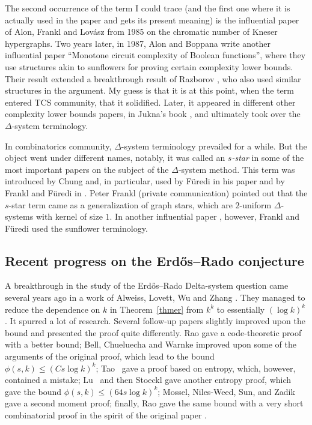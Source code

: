 \documentclass[graybox]{svmult}
\renewcommand{\le}{\leqslant}
\begin{document}
The second occurrence of the term I could trace (and the first one where it is actually used in the paper and gets its present meaning) is the influential paper of Alon, Frankl and Lov\'asz \cite{AFL} from 1985 on the chromatic number of Kneser hypergraphs. Two years later, in 1987, Alon and Boppana \cite{AB} write another influential paper ``Monotone circuit complexity of Boolean functions'', where they use structures akin to sunflowers for proving certain complexity lower bounds. Their result extended a breakthrough result of Razborov \cite{Raz}, who also used similar structures in the argument. My guess is that it is at this point, when the term entered TCS community, that it solidified. Later, it appeared in different other complexity lower bounds papers, in Jukna's book \cite{Juk}, and ultimately took over the $\Delta$-system terminology.

In combinatorics community, $\Delta$-system terminology prevailed for a while. But the object went under different names, notably, it was called an {\it $s$-star} in some of the most important papers on the subject of the $\Delta$-system method. This term was introduced by Chung and, in particular, used by F\"uredi in his paper \cite{Fu1} and by Frankl and F\"uredi in \cite{FF1}. Peter Frankl (private communication) pointed out that the $s$-star term came as a generalization of graph stars, which are $2$-uniform $\Delta$-systems with kernel of size $1$. In another influential paper \cite{FF2}, however, Frankl and F\"uredi used the sunflower terminology.


\subsection{Recent progress on the Erd\H os--Rado conjecture}

A breakthrough in the study of the Erd\H os--Rado Delta-system question came several years ago in a work of Alweiss, Lovett, Wu and Zhang \cite{Alw}. They managed to reduce the dependence on $k$ in  Theorem~\ref{thmer} from $k^k$ to essentially $(\log k)^k$. It spurred a lot of research. Several follow-up papers slightly improved upon the bound and presented the proof quite differently. Rao \cite{Rao} gave a code-theoretic proof with a better bound; Bell, Chueluecha and Warnke \cite{BCW} improved upon some of the arguments of the original proof, which lead to the  bound $\phi(s,k)\le (Cs\log k)^k$;  Tao~\cite{Tao} gave a proof based on entropy, which, however, contained a mistake; Lu~\cite{Hu} and then Stoeckl \cite{Sto} gave another entropy proof, which gave the bound $\phi(s,k)\le (64s\log k)^k$; Mossel, Niles-Weed, Sun, and Zadik \cite{MNSZ} gave a second moment proof; finally, Rao \cite{Rao2} gave the same bound with a very short combinatorial proof in the spirit of the original paper \cite{Alw}.
\end{document}
